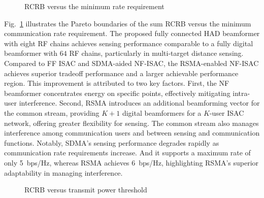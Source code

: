 \documentclass[10pt,journal,twocolumn]{IEEEtran}
\begin{document}
\begin{figure}[tbp]
	\centering
	\centering
	\caption{RCRB versus the minimum rate requirement}
	\label{Fig_QoS}
    \vspace{-0.5cm}
\end{figure}
Fig.~\ref{Fig_QoS} illustrates the Pareto boundaries of the sum RCRB versus the minimum communication rate requirement. The proposed fully connected HAD beamformer with eight RF chains achieves sensing performance comparable to a fully digital beamformer with $64$ RF chains, particularly in multi-target distance sensing. Compared to FF ISAC and SDMA-aided NF-ISAC, the RSMA-enabled NF-ISAC achieves superior tradeoff performance and a larger achievable performance region.
This improvement is attributed to two key factors. First, the NF beamformer concentrates energy on specific points, effectively mitigating intra-user interference. Second, RSMA introduces an additional beamforming vector for the common stream, providing $K+1$ digital beamformers for a 
$K$-user ISAC network, offering greater flexibility for sensing. The common stream also manages interference among communication users and between sensing and communication functions.
Notably, SDMA's sensing performance degrades rapidly as communication rate requirements increase. And it supports a maximum rate of only 5~bps/Hz, whereas RSMA achieves 6~bps/Hz, highlighting RSMA’s superior adaptability in managing interference.

\begin{figure}[tbp]
	\centering
	\centering
	\caption{RCRB versus transmit power threshold}
	\label{Fig_power}
    \vspace{-0.3cm}
\end{figure}
\end{document}
